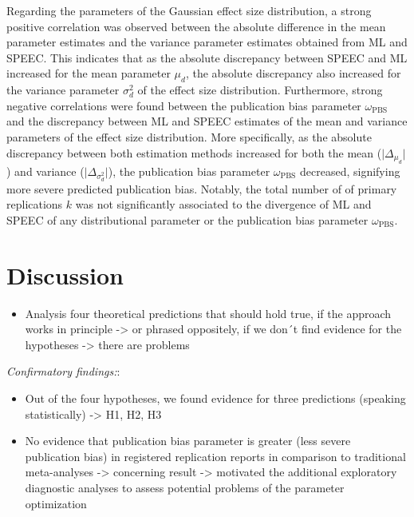 \documentclass[
  12pt,
]{scrartcl}
\providecommand{\tightlist}{%
  \setlength{\itemsep}{0pt}\setlength{\parskip}{0pt}}\usepackage{longtable,booktabs,array}
\newcommand{\pbs}{\omega_{\text{PBS}}}
\begin{document}
Regarding the parameters of the Gaussian effect size distribution, a
strong positive correlation was observed between the absolute difference
in the mean parameter estimates and the variance parameter estimates
obtained from ML and SPEEC. This indicates that as the absolute
discrepancy between SPEEC and ML increased for the mean parameter
\(\mu_d\), the absolute discrepancy also increased for the variance
parameter \(\sigma^2_d\) of the effect size distribution. Furthermore,
strong negative correlations were found between the publication bias
parameter \(\pbs\) and the discrepancy between ML and SPEEC estimates of
the mean and variance parameters of the effect size distribution. More
specifically, as the absolute discrepancy between both estimation
methods increased for both the mean (\(\lvert\Delta_{\mu_d}\rvert\)) and
variance (\(\lvert\Delta_{\sigma^2_d}\rvert\)), the publication bias
parameter \(\pbs\) decreased, signifying more severe predicted
publication bias. Notably, the total number of of primary replications
\(k\) was not significantly associated to the divergence of ML and SPEEC
of any distributional parameter or the publication bias parameter
\(\pbs\).

\newpage

\section{Discussion}\label{discussion}

\begin{itemize}
\tightlist
\item
  Analysis four theoretical predictions that should hold true, if the
  approach works in principle -\textgreater{} or phrased oppositely, if
  we don´t find evidence for the hypotheses -\textgreater{} there are
  problems
\end{itemize}

\emph{Confirmatory findings:}:

\begin{itemize}
\tightlist
\item
  Out of the four hypotheses, we found evidence for three predictions
  (speaking statistically) -\textgreater{} H1, H2, H3
\item
  No evidence that publication bias parameter is greater (less severe
  publication bias) in registered replication reports in comparison to
  traditional meta-analyses -\textgreater{} concerning result
  -\textgreater{} motivated the additional exploratory diagnostic
  analyses to assess potential problems of the parameter optimization
\end{itemize}
\end{document}
